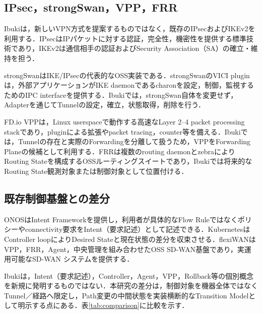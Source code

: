 \documentclass[11pt,a4paper,twoside]{ltjsarticle}
\begin{document}
\subsection{IPsec，strongSwan，VPP，FRR}
Ibukiは，新しいVPN方式を提案するものではなく，既存のIPsecおよびIKEv2を利用する．IPsecはIPパケットに対する認証，完全性，機密性を提供する標準技術であり，IKEv2は通信相手の認証およびSecurity Association（SA）の確立・維持を担う\cite{rfc4301,rfc7296}．

strongSwanはIKE/IPsecの代表的なOSS実装である．strongSwanのVICI pluginは，外部アプリケーションがIKE daemonであるcharonを設定，制御，監視するためのIPC interfaceを提供する\cite{strongswan-vici}．Ibukiでは，strongSwan自体を変更せず，Adapterを通じてTunnelの設定，確立，状態取得，削除を行う．

FD.io VPPは，Linux userspaceで動作する高速なLayer 2--4 packet processing stackであり，pluginによる拡張やpacket tracing，counter等を備える\cite{vpp-doc}．Ibukiでは，Tunnelの存在と実際のForwardingを分離して扱うため，VPPをForwarding Planeの候補として利用する．FRRは複数のrouting daemonとzebraによりRouting Stateを構成するOSSルーティングスイートであり\cite{frr-doc}，Ibukiでは将来的なRouting State観測対象または制御対象として位置付ける．

\subsection{既存制御基盤との差分}
ONOSはIntent Frameworkを提供し，利用者が具体的なFlow Ruleではなくポリシーやconnectivity要求をIntent（要求記述）として記述できる\cite{onos-intent}．KubernetesはController loopによりDesired Stateと現在状態の差分を収束させる\cite{k8s-controller}．flexiWANはVPP，FRR，Agent，中央管理を組み合わせたOSS SD-WAN基盤であり，実運用可能なSD-WAN システムを提供する\cite{flexiwan-arch,flexiwan-about}．

Ibukiは，Intent（要求記述），Controller，Agent，VPP，Rollback等の個別概念を新規に発明するものではない．本研究の差分は，制御対象を機器全体ではなくTunnel／経路へ限定し，Path変更の中間状態を実装横断的なTransition Modelとして明示する点にある．表\ref{tab:comparison}に比較を示す．
\end{document}
